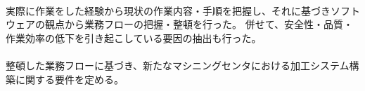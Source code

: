 {\paragraph*{\tpartconclusion}
実際に作業をした経験から現状の作業内容・手順を把握し、それに基づきソフトウェアの観点から業務フローの把握・整頓を行った。
併せて、安全性・品質・作業効率の低下を引き起こしている要因の抽出も行った。
\tcbline*
\paragraph*{\tpartnextstep}
整頓した業務フローに基づき、新たなマシニングセンタにおける加工システム構築に関する要件を定める。
}



%

\begin{appendices}
\end{appendices}

